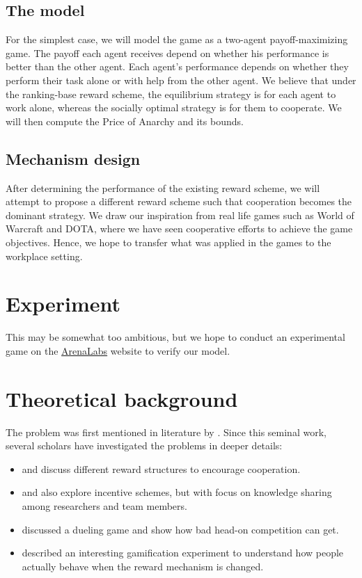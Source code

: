 \documentclass[11pt, a4paper]{article}
\begin{document}
\subsection{The model}
For the simplest case, we will model the game as a two-agent payoff-maximizing game. The payoff each agent receives depend on whether his performance is better than the other agent. Each agent's performance depends on whether they perform their task alone or with help from the other agent. We believe that under the ranking-base reward scheme, the equilibrium strategy is for each agent to work alone, whereas the socially optimal strategy is for them to cooperate. We will then compute the Price of Anarchy and its bounds.

\subsection{Mechanism design}
After determining the performance of the existing reward scheme, we will attempt to propose a different reward scheme such that cooperation becomes the dominant strategy. We draw our inspiration from real life games such as World of Warcraft and DOTA, where we have seen cooperative efforts to achieve the game objectives. Hence, we hope to transfer what was applied in the games to the workplace setting.

\section{Experiment}
This may be somewhat too ambitious, but we hope to conduct an experimental game on the \href{http://arenalabs.co/}{ArenaLabs} website to verify our model.

\section{Theoretical background}
The problem was first mentioned in literature by \cite{Drago1991}. Since this seminal work, several scholars have investigated the problems in deeper details:
\begin{itemize}
	\item \cite{Drago1998} and \cite{Kistruck2016} discuss different reward structures to encourage cooperation.
	\item \cite{Banerjee2014} and \cite{Chakravarti2015} also explore incentive schemes, but with focus on knowledge sharing among researchers and team members.
	\item \cite{Immorlica2011} discussed a dueling game and show how bad head-on competition can get.
	\item \cite{Landers2015} described an interesting gamification experiment to understand how people actually behave when the reward mechanism is changed.
	
\end{itemize}
 
\end{document}
